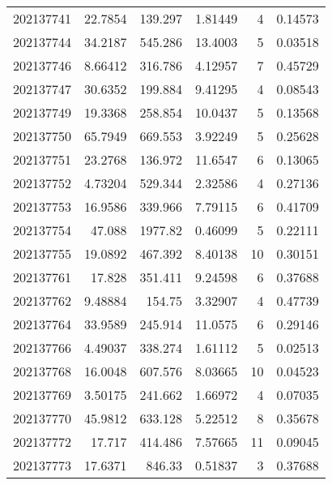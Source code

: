 \begin{tabular}{rrrrrr}
 202137741 &         22.7854  &      139.297  &            1.81449 &           4 & 0.14573 \\
 202137744 &         34.2187  &      545.286  &           13.4003  &           5 & 0.03518 \\
 202137746 &          8.66412 &      316.786  &            4.12957 &           7 & 0.45729 \\
 202137747 &         30.6352  &      199.884  &            9.41295 &           4 & 0.08543 \\
 202137749 &         19.3368  &      258.854  &           10.0437  &           5 & 0.13568 \\
 202137750 &         65.7949  &      669.553  &            3.92249 &           5 & 0.25628 \\
 202137751 &         23.2768  &      136.972  &           11.6547  &           6 & 0.13065 \\
 202137752 &          4.73204 &      529.344  &            2.32586 &           4 & 0.27136 \\
 202137753 &         16.9586  &      339.966  &            7.79115 &           6 & 0.41709 \\
 202137754 &         47.088   &     1977.82   &            0.46099 &           5 & 0.22111 \\
 202137755 &         19.0892  &      467.392  &            8.40138 &          10 & 0.30151 \\
 202137761 &         17.828   &      351.411  &            9.24598 &           6 & 0.37688 \\
 202137762 &          9.48884 &      154.75   &            3.32907 &           4 & 0.47739 \\
 202137764 &         33.9589  &      245.914  &           11.0575  &           6 & 0.29146 \\
 202137766 &          4.49037 &      338.274  &            1.61112 &           5 & 0.02513 \\
 202137768 &         16.0048  &      607.576  &            8.03665 &          10 & 0.04523 \\
 202137769 &          3.50175 &      241.662  &            1.66972 &           4 & 0.07035 \\
 202137770 &         45.9812  &      633.128  &            5.22512 &           8 & 0.35678 \\
 202137772 &         17.717   &      414.486  &            7.57665 &          11 & 0.09045 \\
 202137773 &         17.6371  &      846.33   &            0.51837 &           3 & 0.37688 \\

\end{tabular}
